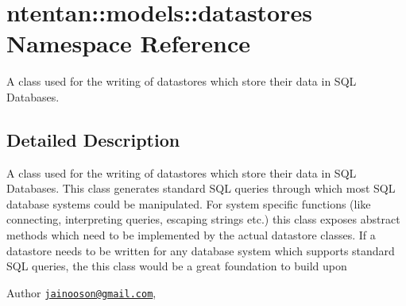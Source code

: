 \hypertarget{namespacententan_1_1models_1_1datastores}{
\section{ntentan::models::datastores Namespace Reference}
\label{namespacententan_1_1models_1_1datastores}
}


A class used for the writing of datastores which store their data in SQL Databases.  




\subsection{Detailed Description}
A class used for the writing of datastores which store their data in SQL Databases. This class generates standard SQL queries through which most SQL database systems could be manipulated. For system specific functions (like connecting, interpreting queries, escaping strings etc.) this class exposes abstract methods which need to be implemented by the actual datastore classes. If a datastore needs to be written for any database system which supports standard SQL queries, the this class would be a great foundation to build upon

\begin{DoxyAuthor}{Author}
\href{mailto:jainooson@gmail.com}{\tt jainooson@gmail.com},
\end{DoxyAuthor}
